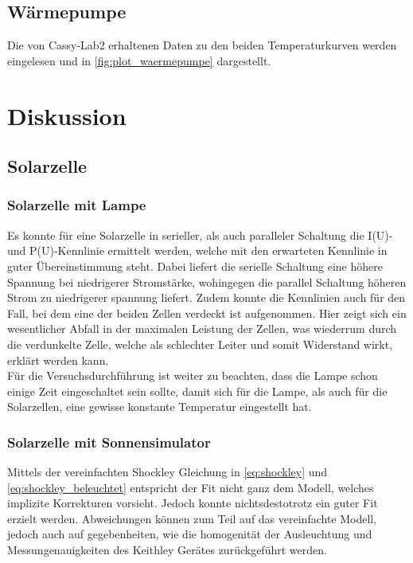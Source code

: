 \documentclass[english, ngerman]{scrartcl}
\begin{document}
\subsection{Wärmepumpe}
\label{subsec:auswertung_waermepumpe}

Die von Cassy-Lab2 erhaltenen Daten zu den beiden Temperaturkurven werden eingelesen und in \autoref{fig:plot_waermepumpe} dargestellt.



\section{Diskussion}
\subsection{Solarzelle}
\label{subsec:diskussion_solar}
\subsubsection{Solarzelle mit Lampe}
\label{subsubsec:diskussion_solar_lampe}
Es konnte für eine Solarzelle in serieller, als auch paralleler Schaltung die I(U)- und P(U)-Kennlinie ermittelt werden, welche mit den erwarteten Kennlinie in guter Übereinstimmung steht. Dabei liefert die serielle Schaltung eine höhere Spannung bei niedrigerer Stromstärke, wohingegen die parallel Schaltung höheren Strom zu niedrigerer spannung liefert. Zudem konnte die Kennlinien auch für den Fall, bei dem eine der beiden Zellen verdeckt ist aufgenommen. Hier zeigt sich ein wesentlicher Abfall in der maximalen Leistung der Zellen, was wiederrum durch die verdunkelte Zelle, welche als schlechter Leiter und somit Widerstand wirkt, erklärt werden kann. \\
%
Für die Versuchsdurchführung ist weiter zu beachten, dass die Lampe schon einige Zeit eingeschaltet sein sollte, damit sich für die Lampe, als auch für die Solarzellen, eine gewisse konstante Temperatur eingestellt hat.\\
%
\subsubsection{Solarzelle mit Sonnensimulator}
\label{subsubsec:diskussion_solar_sonnensimulator} 
Mittels der vereinfachten Shockley Gleichung in \ref{eq:shockley} und \ref{eq:shockley_beleuchtet} entspricht der Fit nicht ganz dem Modell, welches implizite Korrekturen vorsieht. Jedoch konnte nichtsdestotrotz ein guter Fit erzielt werden. Abweichungen können zum Teil auf das vereinfachte Modell, jedoch auch auf gegebenheiten, wie die homogenität der Ausleuchtung und Messungenauigkeiten des Keithley Gerätes zurückgeführt werden.\\
\end{document}
